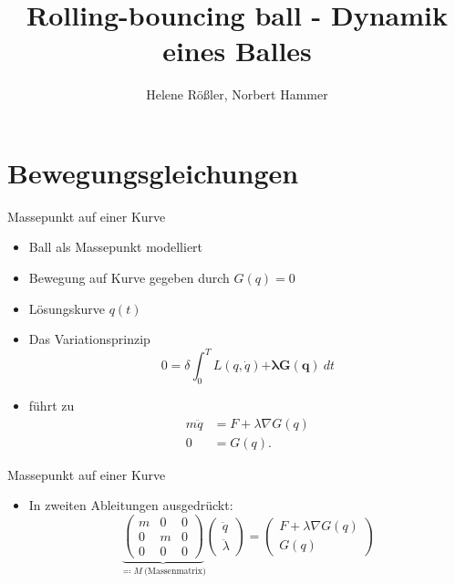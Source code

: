 \documentclass[aspectratio=169]{beamer}
\title{Rolling-bouncing ball - Dynamik eines Balles}
\author{Helene Rößler, Norbert Hammer}
\date{}
\begin{document}
\maketitle

\section{Bewegungsgleichungen}

\begin{frame}{Massepunkt auf einer Kurve}
\begin{itemize}
    \item Ball als Massepunkt modelliert
    \item Bewegung auf Kurve gegeben durch $G(q)=0$
    \item Lösungskurve $q(t)$
    \item Das Variationsprinzip
    \begin{equation*}
        0 = \delta \int_0^T L(q, \dot{q}) \boldsymbol{ + \lambda G(q)} \ dt
    \end{equation*}
    \item führt zu
        \begin{align*}
            m \ddot{q} &= F + \lambda \nabla G(q)\\
            0 &= G(q).
        \end{align*}
\end{itemize}
\end{frame}

\begin{frame}{Massepunkt auf einer Kurve}
\begin{itemize}
    \item In zweiten Ableitungen ausgedrückt:
        \begin{equation*}
        \underbrace{
        \begin{pmatrix}
          m & 0 & 0 \\
          0 & m & 0 \\
          0 & 0 & 0
        \end{pmatrix}}_{\eqcolon M ~ \text{(Massenmatrix)}}
        \begin{pmatrix} \ddot{q} \\ \ddot{\lambda} \end{pmatrix} =
        \begin{pmatrix}
          F + \lambda \nabla G(q)\\
          G(q)
        \end{pmatrix}
        \end{equation*}
\end{itemize}
\end{frame}
\end{document}
